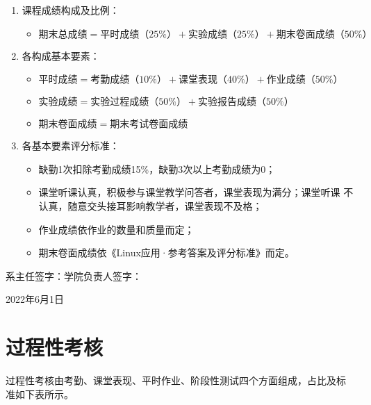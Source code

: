 \documentclass{swfuassessment}
\begin{document}
\begin{enumerate}
\item 课程成绩构成及比例：
  \begin{itemize}
  \item \(期末总成绩 = 平时成绩（25\%）+ 实验成绩（25\%）+ 期末卷面成绩（50\%）\)
  \end{itemize}
\item 各构成基本要素：
  \begin{itemize}
  \item \(平时成绩 = 考勤成绩（10\%）+ 课堂表现（40\%）+ 作业成绩（50\%）\)
  \item \(实验成绩 = 实验过程成绩（50\%）+ 实验报告成绩（50\%）\)
  \item \(期末卷面成绩 = 期末考试卷面成绩\)
  \end{itemize}
\item 各基本要素评分标准：
  \begin{itemize}
  \item 缺勤1次扣除考勤成绩15\%，缺勤3次以上考勤成绩为0；
  \item 课堂听课认真，积极参与课堂教学问答者，课堂表现为满分；课堂听课
    不认真，随意交头接耳影响教学者，课堂表现不及格；
  \item 作业成绩依作业的数量和质量而定；
  \item 期末卷面成绩依《Linux应用·参考答案及评分标准》而定。
  \end{itemize}
\end{enumerate}
\vfill
\begin{flushright}
  系主任签字：\hspace{4cm}学院负责人签字：\hspace*{2cm}\par
  \bigskip
  2022年6月1日
\end{flushright}

\headtwo{}

\section{过程性考核}

过程性考核由考勤、课堂表现、平时作业、阶段性测试四个方面组成，占比及标
准如下表所示。
\end{document}
